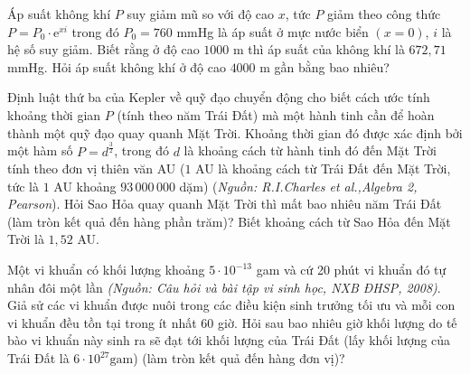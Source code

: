 \begin{bt}%
	Áp suất không khí $P$ suy giảm mũ so với độ cao $x$, tức $P$ giảm theo công thức $P=P_0\cdot \mathrm{e}^{xi}$ trong đó $P_0=760$ mmHg là áp suất ở mực nước biển $(x=0)$, $i$ là hệ số suy giảm. Biết rằng ở độ cao $1000$ m thì áp suất của không khí là $672{,}71$ mmHg. Hỏi áp suất không khí ở độ cao $4000$ m gần bằng bao nhiêu?
\end{bt}

\begin{bt}%
	Định luật thứ ba của Kepler về quỹ đạo chuyển động cho biết cách ước tính khoảng thời gian $P$ (tính theo năm Trái Đất) mà một hành tinh cần để hoàn thành một quỹ đạo quay quanh Mặt Trời. Khoảng thời gian đó được xác định bởi một hàm số $P=d^{\frac{3}{2}}$, trong đó $d$ là khoảng cách từ hành tinh đó đến Mặt Trời tính theo đơn vị thiên văn AU ($1$ AU là khoảng cách từ Trái Đất đến Mặt Trời, tức là $1$ AU khoảng $93\,000\,000$ dặm) (\textit{Nguồn: R.I.Charles et al.,Algebra 2, Pearson}). Hỏi Sao Hỏa quay quanh Mặt Trời thì mất bao nhiêu năm Trái Đất (làm tròn kết quả đến hàng phần trăm)? Biết khoảng cách từ Sao Hỏa đến Mặt Trời là $1{,}52$ AU.
\end{bt}

\begin{bt}%
 
	Một vi khuẩn có khối lượng khoảng $5 \cdot 10^{-13}$ gam và cứ 20 phút vi khuẩn đó tự nhân đôi một lần \textit{(Nguồn: Câu hỏi và bài tập vi sinh học, NXB ĐHSP, 2008)}. Giả sử các vi khuẩn được nuôi trong các điều kiện sinh trưởng tối ưu và mỗi con vi khuẩn đều tồn tại trong ít nhất 60 giờ. Hỏi sau bao nhiêu giờ khối lượng do tế bào vi khuẩn này sinh ra sẽ đạt tới khối lượng của Trái Đất (lấy khối lượng của Trái Đất là $6 \cdot 10^{27} \mathrm{gam}$) (làm tròn kết quả đến hàng đơn vị)?
\end{bt}


